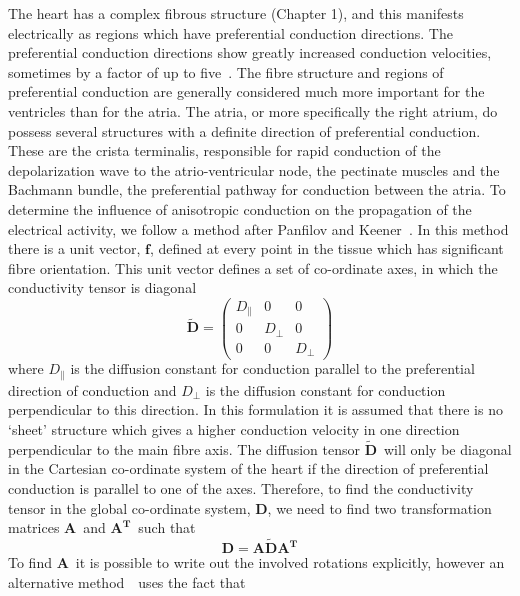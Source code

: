 The heart has a complex fibrous structure (Chapter 1), and this manifests
electrically as regions which have preferential conduction directions.
The preferential conduction directions show greatly increased conduction
velocities, sometimes by a factor of up to five~\cite{}.
The fibre structure and regions of preferential conduction are generally
considered much more important for the ventricles than for the atria.
The atria, or more specifically the right atrium, do possess several structures
with a definite direction of preferential conduction.
These are the crista terminalis, responsible for rapid conduction of the
depolarization wave to the atrio-ventricular node, the pectinate muscles and the
Bachmann bundle, the preferential pathway for conduction between the atria.
To determine the influence of anisotropic conduction on the propagation of the
electrical activity, we follow a method after Panfilov and
Keener~\cite{panfilov1995}.
In this method there is a unit vector, $\mathbf{f}$, defined at every point in
the tissue which has significant fibre orientation.
This unit vector defines a set of co-ordinate axes, in which the conductivity
tensor is diagonal
\begin{equation}
\label{atrium:dtilde}
\mathbf{\tilde{D}} =
\begin{pmatrix}
D_{\parallel} & 0 & 0\\
0 & D_{\perp} & 0\\
0 & 0 & D_{\perp}
\end{pmatrix}
\end{equation}
where $D_{\parallel}$ is the diffusion constant for conduction parallel to the
preferential direction of conduction and $D_{\perp}$ is the diffusion constant
for conduction perpendicular to this direction.
In this formulation it is assumed that there is no `sheet' structure which gives
a higher conduction velocity in one direction perpendicular to the main fibre
axis.
The diffusion tensor $\mathbf{\tilde{D}}$\ will only be diagonal in the
Cartesian co-ordinate system of the heart if the direction of preferential
conduction is parallel to one of the axes.
Therefore, to find the conductivity tensor in the global co-ordinate system,
$\mathbf{D}$, we need to find two transformation matrices $\mathbf{A}$\ and
$\mathbf{A^{T}}$\ such that
\begin{equation}
\label{atrium:d}
\mathbf{D} = \mathbf{A} \mathbf{\tilde{D}} \mathbf{A^{T}}
\end{equation}
To find $\mathbf{A}$\ it is possible to write out the involved rotations
explicitly, however an alternative method~\cite{fention2005}\ uses the fact that
